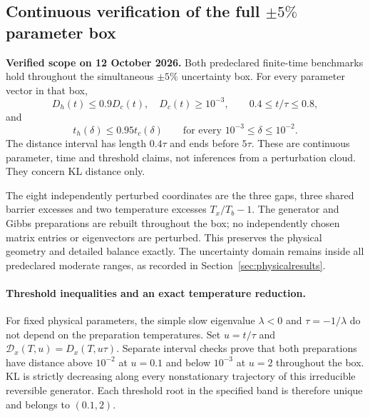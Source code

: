 \subsection{Continuous verification of the full $\pm5\%$ parameter box}
\label{sec:physicalboxcertificate}
\textbf{Verified scope on 12 October 2026.}
Both predeclared finite-time benchmarks hold throughout the simultaneous
$\pm5\%$ uncertainty box. For every parameter vector in that box,
\[
 D_h(t)\leq0.9D_c(t),\quad D_c(t)\geq10^{-3},
 \qquad 0.4\leq t/\tau\leq0.8,
\]
and
\[
 t_h(\delta)\leq0.95t_c(\delta)
 \qquad\text{for every }10^{-3}\leq\delta\leq10^{-2}.
\]
The distance interval has length $0.4\tau$ and ends before $5\tau$.
These are continuous parameter, time and threshold claims, not inferences
from a perturbation cloud. They concern KL distance only.

The eight independently perturbed coordinates are the three gaps, three
shared barrier excesses and two temperature excesses $T_x/T_b-1$.
The generator and Gibbs preparations are rebuilt throughout the box;
no independently chosen matrix entries or eigenvectors are perturbed.
This preserves the physical geometry and detailed balance exactly.
The uncertainty domain remains inside all predeclared moderate ranges,
as recorded in Section~\ref{sec:physicalresults}.

\paragraph{Threshold inequalities and an exact temperature reduction.}
For fixed physical parameters, the simple slow eigenvalue $\lambda<0$
and $\tau=-1/\lambda$ do not depend on the preparation temperatures.
Set $u=t/\tau$ and $\mathcal D_x(T,u)=D_x(T,u\tau)$.
Separate interval checks prove that both preparations have distance
above $10^{-2}$ at $u=0.1$ and below $10^{-3}$ at $u=2$ throughout
the box. KL is strictly decreasing along every nonstationary trajectory
of this irreducible reversible generator. Each threshold root in the
specified band is therefore unique and belongs to $(0.1,2)$.

